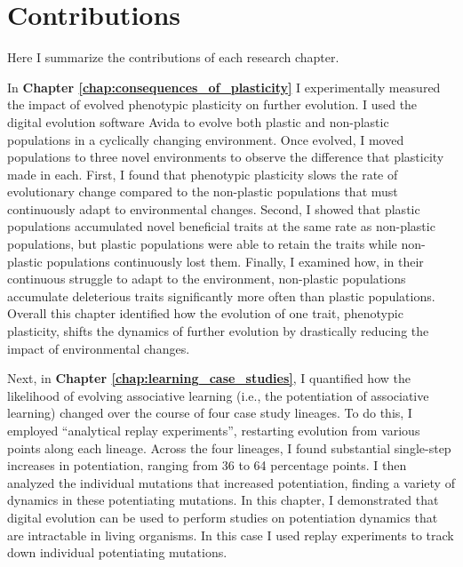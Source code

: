 \section{Contributions}

Here I summarize the contributions of each research chapter. 

In \textbf{Chapter \ref{chap:consequences_of_plasticity}} I experimentally measured the impact of evolved phenotypic plasticity on further evolution. 
I used the digital evolution software Avida to evolve both plastic and non-plastic populations in a cyclically changing environment. 
Once evolved, I moved populations to three novel environments to observe the difference that plasticity made in each. 
First, I found that phenotypic plasticity slows the rate of evolutionary change compared to the non-plastic populations that must continuously adapt to environmental changes. 
Second, I showed that plastic populations accumulated novel beneficial traits at the same rate as non-plastic populations, but plastic populations were able to retain the traits while non-plastic populations continuously lost them. 
Finally, I examined how, in their continuous struggle to adapt to the environment, non-plastic populations accumulate deleterious traits significantly more often than plastic populations. 
Overall this chapter identified how the evolution of one trait, phenotypic plasticity, shifts the dynamics of further evolution by drastically reducing the impact of environmental changes. 

Next, in \textbf{Chapter \ref{chap:learning_case_studies}}, I quantified how the likelihood of evolving associative learning (i.e., the potentiation of associative learning) changed over the course of four case study lineages. 
To do this, I employed ``analytical replay experiments'', restarting evolution from various points along each lineage. 
Across the four lineages, I found substantial single-step increases in potentiation, ranging from 36 to 64 percentage points. 
I then analyzed the individual mutations that increased potentiation, finding a variety of dynamics in these potentiating mutations. 
In this chapter, I demonstrated that digital evolution can be used to perform studies on potentiation dynamics that are intractable in living organisms.
In this case I used replay experiments to track down individual potentiating mutations.  

